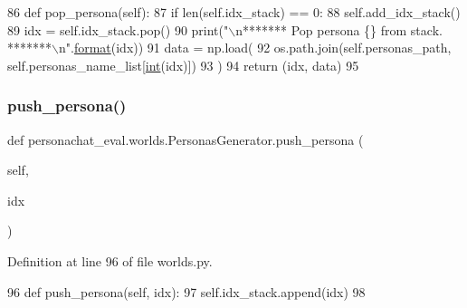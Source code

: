 \begin{DoxyCode}
86     \textcolor{keyword}{def }pop\_persona(self):
87         \textcolor{keywordflow}{if} len(self.idx\_stack) == 0:
88             self.add\_idx\_stack()
89         idx = self.idx\_stack.pop()
90         print(\textcolor{stringliteral}{"\(\backslash\)n******* Pop persona \{\} from stack. *******\(\backslash\)n"}.\hyperlink{namespaceparlai_1_1chat__service_1_1services_1_1messenger_1_1shared__utils_a32e2e2022b824fbaf80c747160b52a76}{format}(idx))
91         data = np.load(
92             os.path.join(self.personas\_path, self.personas\_name\_list[\hyperlink{namespacelanguage__model_1_1eval__ppl_a7d12ee00479673c5c8d1f6d01faa272a}{int}(idx)])
93         )
94         \textcolor{keywordflow}{return} (idx, data)
95 
\end{DoxyCode}
\mbox{\label{classpersonachat__eval_1_1worlds_1_1PersonasGenerator_add94526a589a3e01f2843f88e31b754e}} 
\subsubsection{\texorpdfstring{push\+\_\+persona()}{push\_persona()}}
{\footnotesize\ttfamily def personachat\+\_\+eval.\+worlds.\+Personas\+Generator.\+push\+\_\+persona (\begin{DoxyParamCaption}\item[{}]{self,  }\item[{}]{idx }\end{DoxyParamCaption})}



Definition at line 96 of file worlds.\+py.


\begin{DoxyCode}
96     \textcolor{keyword}{def }push\_persona(self, idx):
97         self.idx\_stack.append(idx)
98 
\end{DoxyCode}
\mbox{\label{classpersonachat__eval_1_1worlds_1_1PersonasGenerator_ae6b7fbf4c1ec66c73f69de4df0357447}} 
